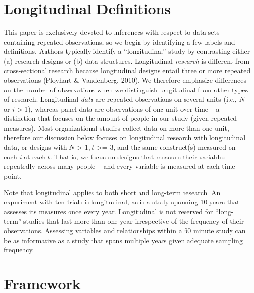 \documentclass[english,,man]{apa6}
\theoremstyle{definition}
\theoremstyle{definition}
\theoremstyle{definition}
\theoremstyle{remark}
\begin{document}
\hypertarget{longitudinal-definitions}{%
\section{Longitudinal Definitions}\label{longitudinal-definitions}}

This paper is exclusively devoted to inferences with respect to data
sets containing repeated observations, so we begin by identifying a few
labels and definitions. Authors typically identify a
\enquote{longitudinal} study by contrasting either (a) research designs
or (b) data structures. Longitudinal \emph{research} is different from
cross-sectional research because longitudinal designs entail three or
more repeated observations (Ployhart \& Vandenberg, 2010). We therefore
emphasize differences on the number of observations when we distinguish
longitudinal from other types of research. Longitudinal \emph{data} are
repeated observations on several units (i.e., \(N\) or \(i\)
\textgreater{} 1), whereas panel data are observations of one unit over
time -- a distinction that focuses on the amount of people in our study
(given repeated measures). Most organizational studies collect data on
more than one unit, therefore our discussion below focuses on
longitudinal research with longitudinal data, or designs with \(N\)
\textgreater{} 1, \(t\) \textgreater{}= 3, and the same construct(s)
measured on each \(i\) at each \(t\). That is, we focus on designs that
measure their variables repeatedly across many people -- and every
variable is measured at each time point.

Note that longitudinal applies to both short and long-term research. An
experiment with ten trials is longitudinal, as is a study spanning 10
years that assesses its measures once every year. Longitudinal is not
reserved for \enquote{long-term} studies that last more than one year
irrespective of the frequency of their observations. Assessing variables
and relationships within a 60 minute study can be as informative as a
study that spans multiple years given adequate sampling frequency.

\hypertarget{framework}{%
\section{Framework}\label{framework}}
\end{document}
